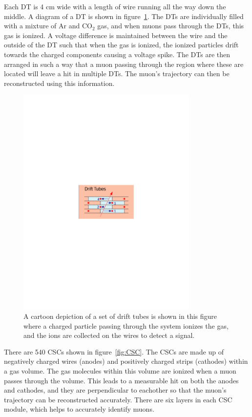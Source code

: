Each DT is 4 cm wide with a length of wire running all the way down the middle.
A diagram of a DT is shown in figure~\ref{fig:DT}.
The DTs are individually filled with a mixture of Ar and $\mathrm{CO_{2}}$ gas, and when muons pass through the DTs, this gas is ionized.
A voltage difference is maintained between the wire and the outside of the DT such that when the gas is ionized,
the ionized particles drift towards the charged components causing a voltage spike.
The DTs are then arranged in such a way that a muon passing through the region where these are located will leave a hit in multiple DTs.
The muon's trajectory can then be reconstructed using this information.

\begin{figure}[!htb]
  \begin{center}
    \includegraphics[width=0.8\textwidth]{cms/figs/DT.pdf}
    \caption{
      \label{fig:DT}
      A cartoon depiction of a set of drift tubes is shown in this figure
      where a charged particle passing through the system ionizes the gas,
      and the ions are collected on the wires to detect a signal.      
    }
  \end{center}
\end{figure}

There are 540 CSCs shown in figure~\ref{fig:CSC}.
The CSCs are made up of negatively charged wires (anodes) and positively charged strips (cathodes) within a gas volume.
The gas molecules within this volume are ionized when a muon passes through the volume.
This leads to a measurable hit on both the anodes and cathodes, and they are perpendicular to eachother so that the muon's trajectory can be reconstructed accurately.
There are six layers in each CSC module, which helps to accurately identify muons.


